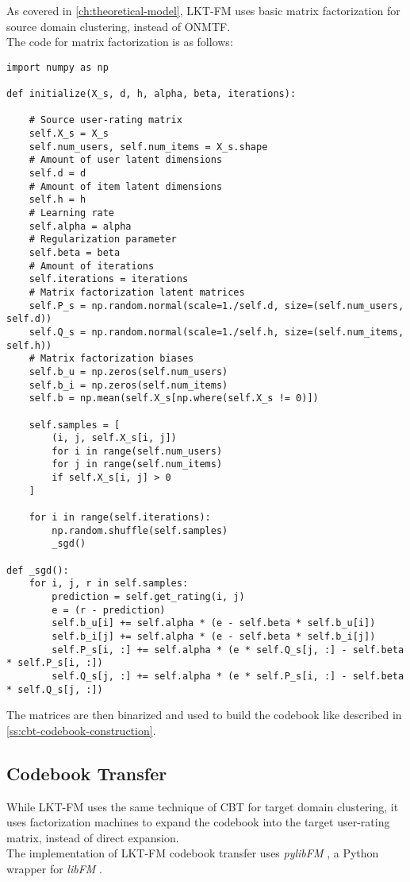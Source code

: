 As covered in \autoref{ch:theoretical-model}, LKT-FM uses basic matrix factorization for source domain clustering, instead of ONMTF.\\
The code for matrix factorization is as follows:
\begin{verbatim}
import numpy as np

def initialize(X_s, d, h, alpha, beta, iterations):

    # Source user-rating matrix
    self.X_s = X_s
    self.num_users, self.num_items = X_s.shape
    # Amount of user latent dimensions
    self.d = d
    # Amount of item latent dimensions
    self.h = h
    # Learning rate
    self.alpha = alpha
    # Regularization parameter
    self.beta = beta
    # Amount of iterations
    self.iterations = iterations
    # Matrix factorization latent matrices
    self.P_s = np.random.normal(scale=1./self.d, size=(self.num_users, self.d))
    self.Q_s = np.random.normal(scale=1./self.h, size=(self.num_items, self.h))
    # Matrix factorization biases
    self.b_u = np.zeros(self.num_users)
    self.b_i = np.zeros(self.num_items)
    self.b = np.mean(self.X_s[np.where(self.X_s != 0)])

    self.samples = [
        (i, j, self.X_s[i, j])
        for i in range(self.num_users)
        for j in range(self.num_items)
        if self.X_s[i, j] > 0
    ]

    for i in range(self.iterations):
        np.random.shuffle(self.samples)
        _sgd()

def _sgd():
    for i, j, r in self.samples:
        prediction = self.get_rating(i, j)
        e = (r - prediction)
        self.b_u[i] += self.alpha * (e - self.beta * self.b_u[i])
        self.b_i[j] += self.alpha * (e - self.beta * self.b_i[j])
        self.P_s[i, :] += self.alpha * (e * self.Q_s[j, :] - self.beta * self.P_s[i, :])
        self.Q_s[j, :] += self.alpha * (e * self.P_s[i, :] - self.beta * self.Q_s[j, :])
\end{verbatim}
The matrices are then binarized and used to build the codebook like described in \autoref{ss:cbt-codebook-construction}.


\subsection{Codebook Transfer}

While LKT-FM uses the same technique of CBT for target domain clustering, it uses factorization machines to expand the codebook into the target user-rating matrix, instead of direct expansion.\\
The implementation of LKT-FM codebook transfer uses \textit{pylibFM} \cite{pylibfm}, a Python wrapper for \textit{libFM} \cite{10.1145/2168752.2168771, libfm}.
